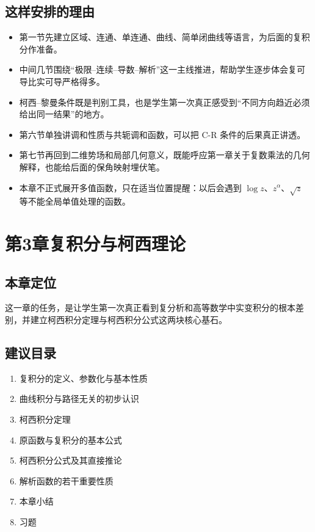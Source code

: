 \subsection*{这样安排的理由}
\begin{itemize}
    \item 第一节先建立区域、连通、单连通、曲线、简单闭曲线等语言，为后面的复积分作准备。
    \item 中间几节围绕``极限--连续--导数--解析''这一主线推进，帮助学生逐步体会复可导比实可导严格得多。
    \item 柯西--黎曼条件既是判别工具，也是学生第一次真正感受到``不同方向趋近必须给出同一结果''的地方。
    \item 第六节单独讲调和性质与共轭调和函数，可以把 C-R 条件的后果真正讲透。
    \item 第七节再回到二维势场和局部几何意义，既能呼应第一章关于复数乘法的几何解释，也能给后面的保角映射埋伏笔。
    \item 本章不正式展开多值函数，只在适当位置提醒：以后会遇到 $\log z$、$z^\alpha$、$\sqrt{z}$ 等不能全局单值处理的函数。
\end{itemize}

\section*{第3章\quad 复积分与柯西理论}

\subsection*{本章定位}
这一章的任务，是让学生第一次真正看到复分析和高等数学中实变积分的根本差别，并建立柯西积分定理与柯西积分公式这两块核心基石。

\subsection*{建议目录}
\begin{enumerate}
    \item 复积分的定义、参数化与基本性质
    \item 曲线积分与路径无关的初步认识
    \item 柯西积分定理
    \item 原函数与复积分的基本公式
    \item 柯西积分公式及其直接推论
    \item 解析函数的若干重要性质
    \item 本章小结
    \item 习题
\end{enumerate}

